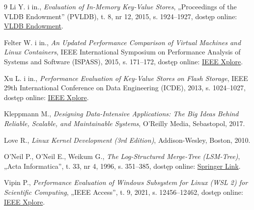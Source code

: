 \begin{thebibliography}{9}
Li Y. i in., \emph{Evaluation of In-Memory Key-Value Stores}, „Proceedings of the VLDB Endowment” (PVLDB), t. 8, nr 12, 2015, s. 1924--1927, dostęp online: \href{http://www.vldb.org/pvldb/vol8/p1924-li.pdf}{VLDB Endowment}.

Felter W. i in., \emph{An Updated Performance Comparison of Virtual Machines and Linux Containers}, IEEE International Symposium on Performance Analysis of Systems and Software (ISPASS), 2015, s. 171--172, dostęp online: \href{https://ieeexplore.ieee.org/document/7095802}{IEEE Xplore}.

Xu L. i in., \emph{Performance Evaluation of Key-Value Stores on Flash Storage}, IEEE 29th International Conference on Data Engineering (ICDE), 2013, s. 1024--1027, dostęp online: \href{https://ieeexplore.ieee.org/document/6544810}{IEEE Xplore}.

Kleppmann M., \emph{Designing Data-Intensive Applications: The Big Ideas Behind Reliable, Scalable, and Maintainable Systems}, O'Reilly Media, Sebastopol, 2017.

Love R., \emph{Linux Kernel Development (3rd Edition)}, Addison-Wesley, Boston, 2010.

O'Neil P., O'Neil E., Weikum G., \emph{The Log-Structured Merge-Tree (LSM-Tree)}, „Acta Informatica”, t. 33, nr 4, 1996, s. 351--385, dostęp online: \href{https://link.springer.com/article/10.1007/s002360050048}{Springer Link}.

Vipin P., \emph{Performance Evaluation of Windows Subsystem for Linux (WSL 2) for Scientific Computing}, „IEEE Access”, t. 9, 2021, s. 12456--12462, dostęp online: \href{https://ieeexplore.ieee.org/document/9336211}{IEEE Xplore}.

\end{thebibliography}
